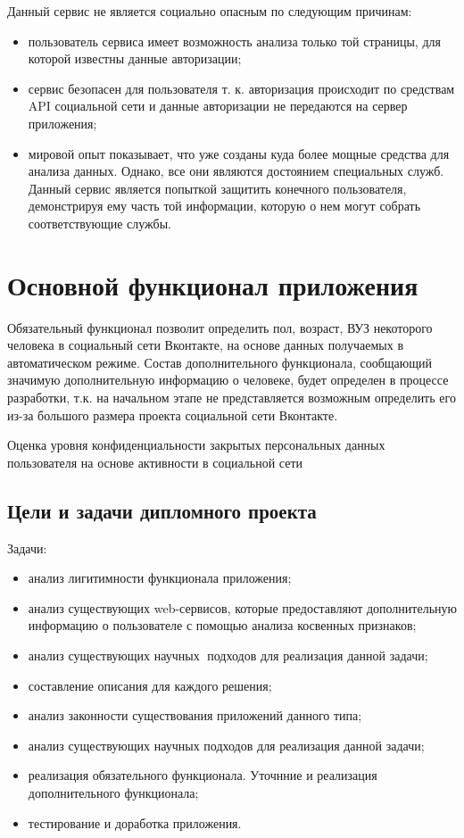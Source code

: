 \begin{chapter1}
Данный сервис не является социально опасным по следующим причинам:
\begin{itemize}
\item пользователь сервиса имеет возможность анализа только той страницы, для которой известны данные авторизации;
\item сервис безопасен для пользователя т. к. авторизация происходит по средствам  API  социальной сети и данные авторизации не передаются на сервер приложения; 
\item мировой опыт показывает, что уже созданы куда более мощные средства для анализа данных. Однако, все они являются достоянием специальных служб. Данный сервис является попыткой защитить конечного пользователя, демонстрируя ему часть той информации, которую о нем могут собрать соответствующие службы.
\end{itemize}

\section{Основной функционал приложения}
Обязательный функционал позволит определить пол, возраст, ВУЗ некоторого человека в социальный сети Вконтакте, на основе данных получаемых в автоматическом режиме. Состав дополнительного функционала, сообщающий значимую дополнительную информацию о человеке,  будет определен в процессе разработки, т.к. на начальном этапе не представляется возможным определить его из-за большого размера проекта социальной сети Вконтакте.

Оценка уровня конфиденциальности закрытых персональных данных пользователя на основе активности в социальной сети
\subsection{Цели и задачи дипломного проекта}
Задачи:
	\begin{itemize}
\item анализ лигитимности функционала приложения;
\item анализ существующих web-сервисов, которые предоставляют дополнительную информацию о пользователе с помощью анализа косвенных признаков;
\item анализ существующих научных подходов для реализация данной задачи;
\item составление описания для каждого решения;
\item анализ законности существования приложений данного типа;
\item анализ существующих научных подходов для реализация данной задачи;
\item реализация обязательного функционала. Уточнние и реализация дополнительного функционала;
\item тестирование и доработка приложения.
	\end{itemize}

\end{chapter1}
